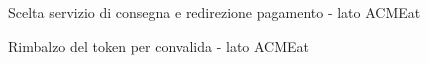 \documentclass[11pt]{article} %
\begin{document}
\begin{figure}[!ht]
\begin{center}
\caption{Scelta servizio di consegna e redirezione pagamento - lato ACMEat}
\end{center}
\end{figure}

\begin{figure}[!ht]
\begin{center}
\caption{Rimbalzo del token per convalida - lato ACMEat}
\end{center}
\end{figure}
\end{document}
